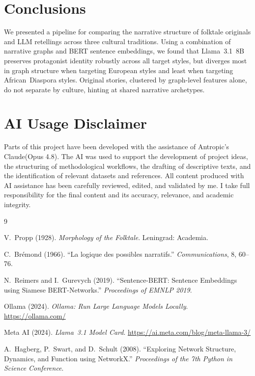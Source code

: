 \documentclass[11pt,a4paper]{article}
\begin{document}
\section{Conclusions}

We presented a pipeline for comparing the narrative structure of folktale
originals and LLM retellings across three cultural traditions.  Using a
combination of narrative graphs and BERT sentence embeddings, we found that
Llama~3.1~8B preserves protagonist identity robustly across all target styles,
but diverges most in graph structure when targeting European styles and least
when targeting African~Diaspora styles.  Original stories, clustered by
graph-level features alone, do not separate by culture, hinting at shared
narrative archetypes.


\section*{AI Usage Disclaimer}

Parts of this project have been developed with the assistance of Antropic's Claude(Opus 4.8). The AI was used to support
the development of project ideas, the structuring of methodological workflows, the drafting of descriptive texts,
and the identification of relevant datasets and references. All content produced with AI assistance has been carefully
reviewed, edited, and validated by me. I take full responsibility for the final content and its accuracy, relevance, and
academic integrity.

\begin{thebibliography}{9}

V.~Propp (1928).
\textit{Morphology of the Folktale}.
Leningrad: Academia.

C.~Br\'{e}mond (1966).
``La logique des possibles narratifs.''
\textit{Communications}, 8, 60--76.

N.~Reimers and I.~Gurevych (2019).
``Sentence-BERT: Sentence Embeddings using Siamese BERT-Networks.''
\textit{Proceedings of EMNLP 2019}.

Ollama (2024).
\textit{Ollama: Run Large Language Models Locally}.
\url{https://ollama.com/}

Meta AI (2024).
\textit{Llama~3.1 Model Card}.
\url{https://ai.meta.com/blog/meta-llama-3/}

A.~Hagberg, P.~Swart, and D.~Schult (2008).
``Exploring Network Structure, Dynamics, and Function using NetworkX.''
\textit{Proceedings of the 7th Python in Science Conference}.

\end{thebibliography}
\end{document}

